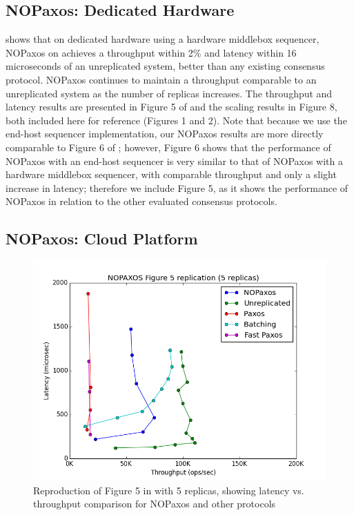 \subsection{NOPaxos: Dedicated Hardware}

\cite{nopaxos} shows that on dedicated hardware using a hardware middlebox sequencer, NOPaxos on achieves a throughput within 2\% and latency within 16 microseconds of an unreplicated system, better than any existing consensus protocol. NOPaxos continues to maintain a throughput comparable to an unreplicated system as the number of replicas increases. The throughput and latency results are presented in Figure 5 of \cite{nopaxos} and the scaling results in Figure 8, both included here for reference (Figures 1 and 2). Note that because we use the end-host sequencer implementation, our NOPaxos results are more directly comparable to Figure 6 of \cite{nopaxos}; however, Figure 6 shows that the performance of NOPaxos with an end-host sequencer is very similar to that of NOPaxos with a hardware middlebox sequencer, with comparable throughput and only a slight increase in latency; therefore we include Figure 5, as it shows the performance of NOPaxos in relation to the other evaluated consensus protocols. 

\subsection{NOPaxos: Cloud Platform}

\begin{figure}[tp]
\centering
\includegraphics[scale=0.5]{figures/Figure5-5.png}
\caption{Reproduction of Figure 5 in \cite{nopaxos} with 5 replicas, showing latency vs. throughput comparison for NOPaxos and other protocols}
\end{figure}

